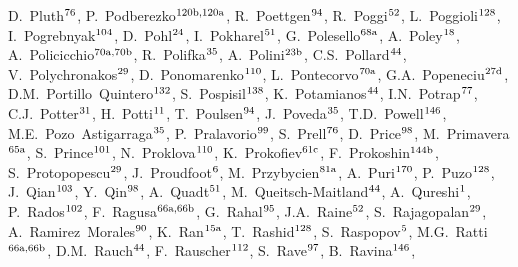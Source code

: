 \begin{flushleft}
D.~Pluth$^\textrm{\scriptsize 76}$,    
P.~Podberezko$^\textrm{\scriptsize 120b,120a}$,    
R.~Poettgen$^\textrm{\scriptsize 94}$,    
R.~Poggi$^\textrm{\scriptsize 52}$,    
L.~Poggioli$^\textrm{\scriptsize 128}$,    
I.~Pogrebnyak$^\textrm{\scriptsize 104}$,    
D.~Pohl$^\textrm{\scriptsize 24}$,    
I.~Pokharel$^\textrm{\scriptsize 51}$,    
G.~Polesello$^\textrm{\scriptsize 68a}$,    
A.~Poley$^\textrm{\scriptsize 18}$,    
A.~Policicchio$^\textrm{\scriptsize 70a,70b}$,    
R.~Polifka$^\textrm{\scriptsize 35}$,    
A.~Polini$^\textrm{\scriptsize 23b}$,    
C.S.~Pollard$^\textrm{\scriptsize 44}$,    
V.~Polychronakos$^\textrm{\scriptsize 29}$,    
D.~Ponomarenko$^\textrm{\scriptsize 110}$,    
L.~Pontecorvo$^\textrm{\scriptsize 70a}$,    
G.A.~Popeneciu$^\textrm{\scriptsize 27d}$,    
D.M.~Portillo~Quintero$^\textrm{\scriptsize 132}$,    
S.~Pospisil$^\textrm{\scriptsize 138}$,    
K.~Potamianos$^\textrm{\scriptsize 44}$,    
I.N.~Potrap$^\textrm{\scriptsize 77}$,    
C.J.~Potter$^\textrm{\scriptsize 31}$,    
H.~Potti$^\textrm{\scriptsize 11}$,    
T.~Poulsen$^\textrm{\scriptsize 94}$,    
J.~Poveda$^\textrm{\scriptsize 35}$,    
T.D.~Powell$^\textrm{\scriptsize 146}$,    
M.E.~Pozo~Astigarraga$^\textrm{\scriptsize 35}$,    
P.~Pralavorio$^\textrm{\scriptsize 99}$,    
S.~Prell$^\textrm{\scriptsize 76}$,    
D.~Price$^\textrm{\scriptsize 98}$,    
M.~Primavera$^\textrm{\scriptsize 65a}$,    
S.~Prince$^\textrm{\scriptsize 101}$,    
N.~Proklova$^\textrm{\scriptsize 110}$,    
K.~Prokofiev$^\textrm{\scriptsize 61c}$,    
F.~Prokoshin$^\textrm{\scriptsize 144b}$,    
S.~Protopopescu$^\textrm{\scriptsize 29}$,    
J.~Proudfoot$^\textrm{\scriptsize 6}$,    
M.~Przybycien$^\textrm{\scriptsize 81a}$,    
A.~Puri$^\textrm{\scriptsize 170}$,    
P.~Puzo$^\textrm{\scriptsize 128}$,    
J.~Qian$^\textrm{\scriptsize 103}$,    
Y.~Qin$^\textrm{\scriptsize 98}$,    
A.~Quadt$^\textrm{\scriptsize 51}$,    
M.~Queitsch-Maitland$^\textrm{\scriptsize 44}$,    
A.~Qureshi$^\textrm{\scriptsize 1}$,    
P.~Rados$^\textrm{\scriptsize 102}$,    
F.~Ragusa$^\textrm{\scriptsize 66a,66b}$,    
G.~Rahal$^\textrm{\scriptsize 95}$,    
J.A.~Raine$^\textrm{\scriptsize 52}$,    
S.~Rajagopalan$^\textrm{\scriptsize 29}$,    
A.~Ramirez~Morales$^\textrm{\scriptsize 90}$,    
K.~Ran$^\textrm{\scriptsize 15a}$,    
T.~Rashid$^\textrm{\scriptsize 128}$,    
S.~Raspopov$^\textrm{\scriptsize 5}$,    
M.G.~Ratti$^\textrm{\scriptsize 66a,66b}$,    
D.M.~Rauch$^\textrm{\scriptsize 44}$,    
F.~Rauscher$^\textrm{\scriptsize 112}$,    
S.~Rave$^\textrm{\scriptsize 97}$,    
B.~Ravina$^\textrm{\scriptsize 146}$,    

\end{flushleft}
